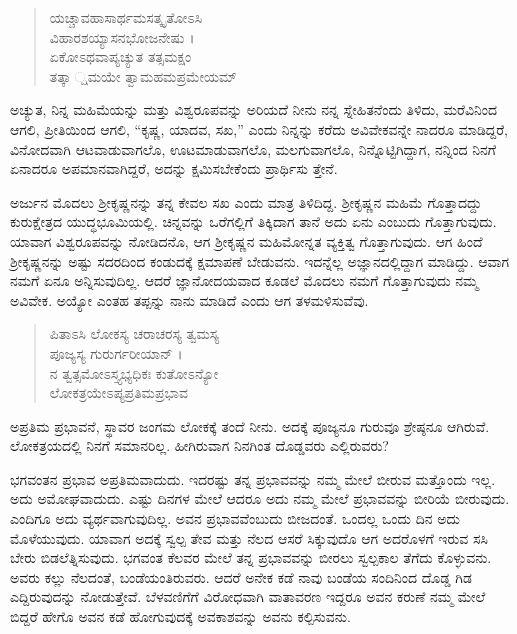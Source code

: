 \begin{verse}
ಯಚ್ಚಾವಹಾಸಾರ್ಥಮಸತ್ಕೃತೋಽಸಿ \\ ವಿಹಾರಶಯ್ಯಾಸನಭೋಜನೇಷು ।\\ಏಕೋಽಥವಾಪ್ಯಚ್ಯುತ ತತ್ಸಮಕ್ಷಂ \\ ತತ್ಕಾ ್ಷಮಯೇ ತ್ವಾಮಹಮಪ್ರಮೇಯಮ್ 
\end{verse}

{\small ಅಚ್ಯುತ, ನಿನ್ನ ಮಹಿಮೆಯನ್ನು ಮತ್ತು ವಿಶ್ವರೂಪವನ್ನು ಅರಿಯದೆ ನೀನು ನನ್ನ ಸ್ನೇಹಿತನೆಂದು ತಿಳಿದು, ಮರೆವಿನಿಂದ ಆಗಲಿ, ಪ್ರೀತಿಯಿಂದ ಆಗಲಿ, “ಕೃಷ್ಣ, ಯಾದವ, ಸಖ,” ಎಂದು ನಿನ್ನನ್ನು ಕರೆದು ಅವಿವೇಕವನ್ನೇ ನಾದರೂ ಮಾಡಿದ್ದರೆ, ವಿನೋದವಾಗಿ ಆಟವಾಡುವಾಗಲೊ, ಊಟಮಾಡುವಾಗಲೊ, ಮಲಗುವಾಗಲೊ, ನಿನ್ನೊಟ್ಟಿಗಿದ್ದಾಗ, ನನ್ನಿಂದ ನಿನಗೆ ಏನಾದರೂ ಅಪಮಾನವಾಗಿದ್ದರೆ, ಅದನ್ನು ಕ್ಷಮಿಸಬೇಕೆಂದು ಪ್ರಾರ್ಥಿಸು ತ್ತೇನೆ.}

ಅರ್ಜುನ ಮೊದಲು ಶ್ರೀಕೃಷ್ಣನನ್ನು ತನ್ನ ಕೇವಲ ಸಖ ಎಂದು ಮಾತ್ರ ತಿಳಿದಿದ್ದ. ಶ್ರೀಕೃಷ್ಣನ ಮಹಿಮೆ ಗೊತ್ತಾದದ್ದು ಕುರುಕ್ಷೇತ್ರದ ಯುದ್ಧಭೂಮಿಯಲ್ಲಿ. ಚಿನ್ನವನ್ನು ಒರೆಗಲ್ಲಿಗೆ ತಿಕ್ಕಿದಾಗ ತಾನೆ ಅದು ಏನು ಎಂಬುದು ಗೊತ್ತಾಗುವುದು. ಯಾವಾಗ ವಿಶ್ವರೂಪವನ್ನು ನೋಡಿದನೊ, ಆಗ ಶ್ರೀಕೃಷ್ಣನ ಮಹಿಮೋನ್ನತ ವ್ಯಕ್ತಿತ್ವ ಗೊತ್ತಾಗುವುದು. ಆಗ ಹಿಂದೆ ಶ್ರೀಕೃಷ್ಣನನ್ನು ಅಷ್ಟು ಸದರದಿಂದ ಕಂಡುದಕ್ಕೆ ಕ್ಷಮಾಪಣೆ ಬೇಡುವನು. ಇದನ್ನೆಲ್ಲ ಅಜ್ಞಾನದಲ್ಲಿದ್ದಾಗ ಮಾಡಿದ್ದು. ಆವಾಗ ನಮಗೆ ಏನೂ ಅನ್ನಿಸುವುದಿಲ್ಲ. ಆದರೆ ಜ್ಞಾನೋದಯವಾದ ಕೂಡಲೆ ಮೊದಲು ನಮಗೆ ಗೊತ್ತಾಗುವುದು ನಮ್ಮ ಅವಿವೇಕ. ಅಯ್ಯೋ ಎಂತಹ ತಪ್ಪನ್ನು ನಾನು ಮಾಡಿದೆ ಎಂದು ಆಗ ತಳಮಳಿಸುವೆವು.

\begin{verse}
ಪಿತಾಽಸಿ ಲೋಕಸ್ಯ ಚರಾಚರಸ್ಯ ತ್ವಮಸ್ಯ \\ ಪೂಜ್ಯಸ್ಯ ಗುರುರ್ಗರೀಯಾನ್ ।\\ನ ತ್ವತ್ಸಮೋಽಸ್ತ್ಯಭ್ಯಧಿಕಃ ಕುತೋಽನ್ಯೋ \\ ಲೋಕತ್ರಯೇಽಪ್ಯಪ್ರತಿಮಪ್ರಭಾವ 
\end{verse}

{\small ಅಪ್ರತಿಮ ಪ್ರಭಾವನೆ, ಸ್ಥಾವರ ಜಂಗಮ ಲೋಕಕ್ಕೆ ತಂದೆ ನೀನು. ಅದಕ್ಕೆ ಪೂಜ್ಯನೂ ಗುರುವೂ ಶ್ರೇಷ್ಠನೂ ಆಗಿರುವೆ. ಲೋಕತ್ರಯದಲ್ಲಿ ನಿನಗೆ ಸಮಾನರಿಲ್ಲ. ಹೀಗಿರುವಾಗ ನಿನಗಿಂತ ದೊಡ್ಡವರು ಎಲ್ಲಿರುವರು?}

ಭಗವಂತನ ಪ್ರಭಾವ ಅಪ್ರತಿಮವಾದುದು. ಇದರಷ್ಟು ತನ್ನ ಪ್ರಭಾವವನ್ನು ನಮ್ಮ ಮೇಲೆ ಬೀರುವ ಮತ್ತೊಂದು ಇಲ್ಲ. ಅದು ಅಮೋಘವಾದುದು. ಎಷ್ಟು ದಿನಗಳ ಮೇಲೆ ಆದರೂ ಅದು ನಮ್ಮ ಮೇಲೆ ಪ್ರಭಾವವನ್ನು ಬೀರಿಯೆ ಬೀರುವುದು. ಎಂದಿಗೂ ಅದು ವ್ಯರ್ಥವಾಗುವುದಿಲ್ಲ. ಅವನ ಪ್ರಭಾವವೆಂಬುದು ಬೀಜದಂತೆ. ಒಂದಲ್ಲ ಒಂದು ದಿನ ಅದು ಮೊಳೆಯುವುದು. ಯಾವಾಗ ಅದಕ್ಕೆ ಸ್ವಲ್ಪ ತೇವ ಮತ್ತು ನೆಲದ ಆಸರೆ ಸಿಕ್ಕುವುದೊ ಆಗ ಅದರೊಳಗೆ ಇರುವ ಸಸಿ ಬೇರು ಬಿಡಲೆತ್ನಿಸುವುದು. ಭಗವಂತ ಕೆಲವರ ಮೇಲೆ ತನ್ನ ಪ್ರಭಾವವನ್ನು ಬೀರಲು ಸ್ವಲ್ಪಕಾಲ ತೆಗೆದು ಕೊಳ್ಳುವನು. ಅವರು ಕಲ್ಲು ನೆಲದಂತೆ, ಬಂಡೆಯಂತಿರುವರು. ಆದರೆ ಅನೇಕ ಕಡೆ ನಾವು ಬಂಡೆಯ ಸಂದಿನಿಂದ ದೊಡ್ಡ ಗಿಡ ಎದ್ದಿರುವುದನ್ನು ನೋಡುತ್ತೇವೆ. ಬೆಳವಣಿಗೆಗೆ ವಿರೋಧವಾಗಿ ವಾತಾವರಣ ಇದ್ದರೂ ಅವನ ಕರುಣೆ ನಮ್ಮ ಮೇಲೆ ಬಿದ್ದರೆ ಹೇಗೊ ಅವನ ಕಡೆ ಹೋಗುವುದಕ್ಕೆ ಅವಕಾಶವನ್ನು ಅವನು ಕಲ್ಪಿಸುವನು.

